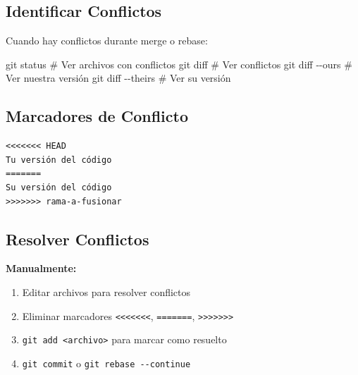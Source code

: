 \documentclass[
  doc,
  floatsintext,
  longtable,
  a4paper,
  nolmodern,
  notxfonts,
  notimes,
  12pt,
  colorlinks=true,linkcolor=blue,citecolor=blue,urlcolor=blue]{apa7}
\newenvironment{Shaded}{\begin{snugshade}}{\end{snugshade}}
\newcommand{\AttributeTok}[1]{\textcolor[rgb]{0.40,0.45,0.13}{#1}}
\newcommand{\CommentTok}[1]{\textcolor[rgb]{0.37,0.37,0.37}{#1}}
\newcommand{\FunctionTok}[1]{\textcolor[rgb]{0.28,0.35,0.67}{#1}}
\newcommand{\NormalTok}[1]{\textcolor[rgb]{0.00,0.23,0.31}{#1}}
\providecommand{\tightlist}{%
  \setlength{\itemsep}{0pt}\setlength{\parskip}{0pt}}
\begin{document}
\subsection{Identificar Conflictos}\label{identificar-conflictos}

Cuando hay conflictos durante merge o rebase:

\begin{Shaded}
\begin{Highlighting}[]
\FunctionTok{git}\NormalTok{ status                 }\CommentTok{\# Ver archivos con conflictos}
\FunctionTok{git}\NormalTok{ diff                   }\CommentTok{\# Ver conflictos}
\FunctionTok{git}\NormalTok{ diff }\AttributeTok{{-}{-}ours}            \CommentTok{\# Ver nuestra versión}
\FunctionTok{git}\NormalTok{ diff }\AttributeTok{{-}{-}theirs}          \CommentTok{\# Ver su versión}
\end{Highlighting}
\end{Shaded}

\subsection{Marcadores de Conflicto}\label{marcadores-de-conflicto}

\begin{verbatim}
<<<<<<< HEAD
Tu versión del código
=======
Su versión del código
>>>>>>> rama-a-fusionar
\end{verbatim}

\subsection{Resolver Conflictos}\label{resolver-conflictos}

\textbf{Manualmente:}

\begin{enumerate}
\def\labelenumi{\arabic{enumi}.}
\tightlist
\item
  Editar archivos para resolver conflictos
\item
  Eliminar marcadores
  \texttt{\textless{}\textless{}\textless{}\textless{}\textless{}\textless{}\textless{}},
  \texttt{=======},
  \texttt{\textgreater{}\textgreater{}\textgreater{}\textgreater{}\textgreater{}\textgreater{}\textgreater{}}
\item
  \texttt{git\ add\ \textless{}archivo\textgreater{}} para marcar como
  resuelto
\item
  \texttt{git\ commit} o \texttt{git\ rebase\ -\/-continue}
\end{enumerate}
\end{document}
